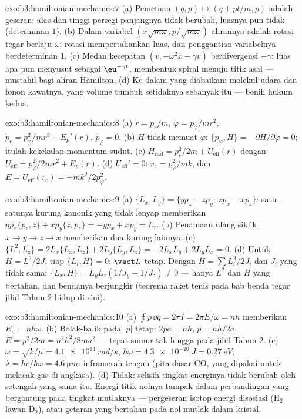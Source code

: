 \begin{solution}{exo:b3:hamiltonian-mechanics:7}
(a) Pemetaan $(q, p) \mapsto (q + pt/m, p)$ adalah geseran: alas dan
tinggi persegi panjangnya tidak berubah, luasnya pun tidak (determinan $1$).
(b) Dalam variabel $(x\sqrt{m\omega}, p/\sqrt{m\omega})$ alirannya adalah
rotasi tegar berlaju $\omega$; rotasi mempertahankan luas, dan
penggantian variabelnya berdeterminan $1$. (c) Medan kecepatan
$(v, -\omega^2x - \gamma v)$ berdivergensi $-\gamma$: luas apa pun
menyusut sebagai $\eu^{-\gamma t}$, membentuk spiral menuju titik asal
--- mustahil bagi aliran Hamilton. (d) Ke dalam  yang
diabaikan: molekul udara dan fonon kawatnya, yang volume 
tumbuh setidaknya sebanyak itu --- benih hukum kedua.
\end{solution}

\begin{solution}{exo:b3:hamiltonian-mechanics:8}
(a) $\dot r = p_r/m$, $\dot\varphi = p_\varphi/mr^2$, $\dot p_r =
p_\varphi^2/mr^3 - E_p'(r)$, $\dot p_\varphi = 0$. (b) $H$ tidak memuat
$\varphi$: $\{p_\varphi, H\} = -\partial H/\partial\varphi =
0$; itulah kekekalan momentum sudut. (c) $H_{\text{rad}} = p_r^2/2m +
U_{\text{eff}}(r)$ dengan $U_{\text{eff}} = p_\varphi^2/2mr^2 + E_p(r)$.
(d) $U_{\text{eff}}' = 0$: $r_{\text{c}} = p_\varphi^2/mk$, dan $E =
U_{\text{eff}}(r_{\text{c}}) = -mk^2/2p_\varphi^2$.
\end{solution}

\begin{solution}{exo:b3:hamiltonian-mechanics:9}
(a) $\{L_x, L_y\} = \{yp_z - zp_y,\ zp_x - xp_z\}$: satu-satunya kurung
kanonik yang tidak lenyap memberikan $yp_x\{p_z, z\} + xp_y\{z,
p_z\} = -yp_x + xp_y = L_z$. (b) Penamaan ulang siklik $x \to y \to z \to
x$ memberikan dua kurung lainnya. (c) $\{L^2, L_z\} = 2L_x\{L_x, L_z\} +
2L_y\{L_y, L_z\} = -2L_xL_y + 2L_yL_x = 0$. (d) Untuk $H = L^2/2J$,
tiap $\{L_i, H\} = 0$: $\vect L$ tetap. Dengan $H = \sum L_i^2/2J_i$
dan $J_i$ yang tidak sama: $\{L_x, H\} = L_yL_z(1/J_y - 1/J_z) \neq 0$ ---
hanya $L^2$ dan $H$ yang bertahan, dan bendanya berjungkir (teorema
raket tenis pada bab benda tegar jilid Tahun 2 hidup di sini).
\end{solution}

\begin{solution}{exo:b3:hamiltonian-mechanics:10}
(a) $\oint p\,\dd q = 2\pi I = 2\pi E/\omega = nh$ memberikan $E_n =
n\hbar\omega$. (b) Bolak-balik pada $|p|$ tetap: $2pa = nh$, $p =
nh/2a$, $E = p^2/2m = n^2h^2/8ma^2$ --- tepat sumur tak hingga pada
jilid Tahun 2. (c) $\omega = \sqrt{k/\mu} = \qty{4.1e14}{rad/s}$,
$\hbar\omega = \qty{4.3e-20}{J} = \qty{0.27}{eV}$, $\lambda = hc/
\hbar\omega = \qty{4.6}{\micro m}$: inframerah tengah (pita dasar CO,
yang dipakai untuk melacak gas di angkasa). (d) Tidak: selisih tingkat
energinya tidak berubah oleh setengah yang sama itu. Energi titik nolnya
tampak dalam perbandingan yang bergantung pada tingkat mutlaknya ---
pergeseran isotop energi disosiasi (H$_2$ lawan D$_2$), atau getaran
yang bertahan pada nol mutlak dalam kristal.
\end{solution}

